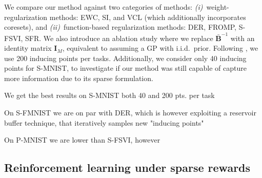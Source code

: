\documentclass{article}
\newlength{\tblw}
\newcommand{\our}{\textsc{sfr}\xspace}
\newcommand{\mbf}[1]{\mathbf{#1}}
\newcommand{\MB}{\mbf{B}}
\newcommand{\MI}{\mbf{I}}
\begin{document}
We compare our method against two categories of methods: {\em (i)}~weight-regularization methods: EWC, SI, and VCL (which additionally incorporates coresets), and {\em(ii)}~function-based regularization methods: DER, FROMP, S-FSVI, SFR. We also introduce an ablation study where we replace $\bar{\MB}^{-1}$ with an identity matrix $\MI_M$, equivalent to assuming a GP with i.i.d.\ prior.
Following \cite{rudner2022continual}, we use 200 inducing points per tasks. Additionally,  we consider only 40 inducing points for S-MNIST, to investigate if our method was still capable of capture more information due to its sparse formulation.

We get the best results on S-MNIST both 40 and 200 pts. per task

On S-FMNIST we are on par with DER, which is however exploiting a reservoir buffer technique, that iteratively samples new "inducing points"

On P-MNIST we are lower than S-FSVI, however %




\begin{table}[t!] 
  \centering\scriptsize
  \caption{
  TODO: CL Experiments. $^*$ Methods relying only on weight regularization. 
  }
	\label{tbl:cl_table_1}
	\renewcommand{\arraystretch}{1.}
	\setlength{\tabcolsep}{2pt}
	\setlength{\tblw}{0.14\textwidth}  
	
	\newcommand{\val}[2]{%
		$#1$\textcolor{gray}{\tiny ${\pm}#2$}
	} 
	
	
\end{table}


\subsection{Reinforcement learning under sparse rewards}
\label{sec:rl-exp}
\end{document}
